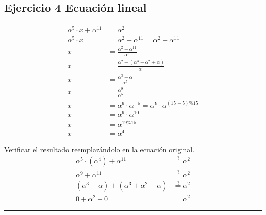 \documentclass[11pt,fleqn]{article}
\begin{document}
\subsection*{Ejercicio 4 Ecuación lineal}
\begin{align*}
    \alpha^5\cdot x+\alpha^{11}&=\alpha^2\\
    \alpha^5\cdot x&=\alpha^2-\alpha^{11}=\alpha^2+\alpha^{11}\\
    x&=\frac{\alpha^2+\alpha^{11}}{\alpha^5}\\
    x&=\frac{\alpha^2+(\alpha^3+\alpha^2+\alpha)}{\alpha^5}\\
    x&=\frac{\alpha^3+\alpha}{\alpha^5}\\
    x&=\frac{\alpha^9}{\alpha^5}\\
    x&=\alpha^9\cdot\alpha^{-5}=\alpha^9\cdot\alpha^{(15-5)\%15}\\
    x&=\alpha^9\cdot\alpha^{10}\\
    x&=\alpha^{19\%15}\\
    x&=\alpha^4
\end{align*}

Verificar el resultado reemplazándolo en la ecuación original.
\begin{align*}
    \alpha^5\cdot(\alpha^4)+\alpha^{11}&\overset{?}{=}\alpha^2\\
    \alpha^9+\alpha^{11}&\overset{?}{=}\alpha^2\\
    (\alpha^3+\alpha)+(\alpha^3+\alpha^2+\alpha)&\overset{?}{=}\alpha^2\\
    0+\alpha^2+0&=\alpha^2
\end{align*}

\vspace{1em}
\hrule
\vspace{1em}



\end{document}
